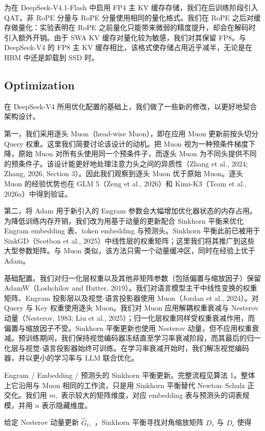 \documentclass[
  10
]{article}
\begin{document}
为在 DeepSeek-V4.1-Flash 中启用 FP4 主 KV 缓存存储，我们在后训练阶段引入 QAT。非 RoPE 分量与 RoPE 分量使用相同的量化格式。我们在 RoPE 之后对缓存做量化：实验表明在 RoPE 之前量化只能带来微弱的精度提升，却会在解码时引入额外开销。由于 SWA KV 缓存对量化较为敏感，我们对其保留 FP8。与 DeepSeek-V4 的 FP8 主 KV 缓存相比，该格式使存储占用近乎减半，无论是在 HBM 中还是卸载到 SSD 时。
\subsection{Optimization}\label{optimization}

在 DeepSeek-V4 所用优化配置的基础上，我们做了一些新的修改，以更好地契合架构设计。

第一，我们采用逐头 Muon（head-wise Muon），即在应用 Muon 更新前按头切分 Query 权重。这里我们简要讨论该设计的动机。把 Muon 视为一种预条件梯度下降，原始 Muon 对所有头使用同一个预条件子，而逐头 Muon 为不同头提供不同的预条件子。该设计能更好地处理注意力头之间的异质性（Zhang et al., 2024; Zhang, 2026, Section 3）。因此我们观察到逐头 Muon 优于原始 Muon。逐头 Muon 的经验优势也在 GLM 5（Zeng et al., 2026）和 Kimi-K3（Team et al., 2026a）中得到验证。

第二，将 Adam 用于新引入的 Engram 参数会大幅增加优化器状态的内存占用。为降低训练内存开销，我们改为用基于动量的更新配合 Sinkhorn 平衡来优化 Engram embedding 表、token embedding 与预测头。Sinkhorn 平衡此前已被用于 SinkGD（Scetbon et al., 2025）中线性层的权重矩阵；这里我们将其推广到这些大型参数矩阵。与 Muon 类似，该方法只需一个动量缓冲区，同时在经验上优于 Adam。

基础配置。我们对归一化层权重以及其他非矩阵参数（包括偏置与缩放因子）保留 AdamW（Loshchilov and Hutter, 2019）。我们对语言模型主干中线性变换的权重矩阵、Engram 投影层以及视觉-语言投影器使用 Muon（Jordan et al., 2024）。对 Query 与 Key 权重使用逐头 Muon。我们对 Muon 应用解耦权重衰减与 Nesterov 动量（Nesterov, 1983; Liu et al., 2025）；归一化层权重同样受权重衰减作用，而偏置与缩放因子不受。Sinkhorn 平衡更新也使用 Nesterov 动量，但不应用权重衰减。预训练期间，我们保持视觉编码器冻结直至学习率衰减阶段，而其最后的归一化层与视觉-语言投影器始终可训练。在学习率衰减开始时，我们解冻视觉编码器，并以更小的学习率与 LLM 联合优化。

Engram / Embedding / 预测头的 Sinkhorn 平衡更新。完整流程见算法 1。整体上它沿用与 Muon 相同的工作流，只是用 Sinkhorn 平衡替代 Newton--Schulz 正交化。我们用 \(m ,\) 表示较大的矩阵维度，对应 embedding 表与预测头的词表规模，并用 \(n\) 表示隐藏维度。

给定 Nesterov 动量更新 \(\widehat { G } _ { t } ,\) ，Sinkhorn 平衡寻找对角缩放矩阵 \(D _ { r }\) 与 \(D _ { c }\) 使得
\end{document}
